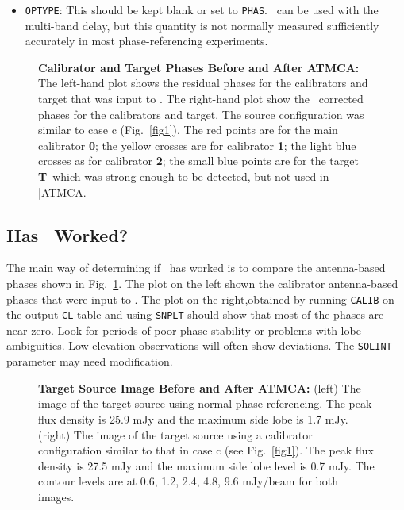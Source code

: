 {\begin {itemize}
\item {\tt OPTYPE}:  This should be kept blank or set to {\tt PHAS}.
\ATMCA~can be used with the multi-band delay, but this quantity is
not normally measured sufficiently accurately in most phase-referencing
experiments.
\end{itemize}

\begin{figure}[t!]
\vskip -2.4in
\vskip -2.3in
\caption{\small{\bf Calibrator and Target Phases Before and After
ATMCA:} The left-hand plot shows the residual phases for the
calibrators and target that was input to \ATMCA.  The right-hand plot
show the \ATMCA~corrected phases for the calibrators and target.  The
source configuration was similar to case {\bf }c (Fig.~\ref{fig1}).
The red points are for the main calibrator {\bf 0}; the yellow crosses
are for calibrator {\bf 1}; the light blue crosses as for calibrator
{\bf 2}; the small blue points are for the target {\bf T}~which was
strong enough to be detected, but not used in |ATMCA.\normalsize}
\label{fig3}
\end{figure}

\subsection {Has \ATMCA~Worked?}

     The main way of determining if \ATMCA~has worked is to compare
the antenna-based phases shown in Fig.~\ref{fig3}.  The plot on the
left shown the calibrator antenna-based phases that were input to
\ATMCA.  The plot on the right,obtained by running {\tt CALIB} on the
output {\tt CL} table and using {\tt SNPLT} should show that most of
the phases are near zero.  Look for periods of poor phase stability or
problems with lobe ambiguities.  Low elevation observations will often
show deviations.  The {\tt SOLINT} parameter may need modification.

\begin{figure}[t!]
\vskip -2.0in
\vskip -2.00in
\caption{\small{\bf Target Source Image Before and After ATMCA:}
(left) The image of the target source using normal phase
referencing. The peak flux density is 25.9 mJy and the maximum side
lobe is 1.7 mJy.  (right) The image of the target source using a
calibrator configuration similar to that in case c (see
Fig.~\ref{fig1}).  The peak flux density is 27.5 mJy and the maximum
side lobe level is 0.7 mJy.  The contour levels are at 0.6, 1.2, 2.4,
4.8, 9.6 mJy/beam for both images.\normalsize}
\label{fig4}
\end{figure}

}
